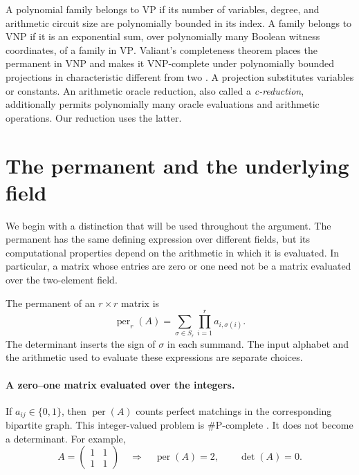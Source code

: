 \documentclass[12pt,a4paper]{article}
\theoremstyle{definition}
\theoremstyle{remark}
\newcommand{\per}{\operatorname{per}}
\newcommand{\VP}{\mathrm{VP}}
\newcommand{\VNP}{\mathrm{VNP}}
\begin{document}
A polynomial family belongs to $\VP$ if its number of variables, degree,
and arithmetic circuit size are polynomially bounded in its index. A
family belongs to $\VNP$ if it is an exponential sum, over polynomially
many Boolean witness coordinates, of a family in $\VP$. Valiant's
completeness theorem places the permanent in $\VNP$ and makes it
$\VNP$-complete under polynomially bounded projections in characteristic
different from two \cite[Theorem 2]{ValiantAlgebra}. A projection substitutes
variables or constants. An arithmetic oracle reduction, also called a
\emph{c-reduction}, additionally permits polynomially many oracle
evaluations and arithmetic operations. Our reduction uses the latter.

\section{The permanent and the underlying field}
\label{sec:binary}

We begin with a distinction that will be used throughout the argument.
The permanent has the same defining expression over different fields,
but its computational properties depend on the arithmetic in which it
is evaluated. In particular, a matrix whose entries are zero or one
need not be a matrix evaluated over the two-element field.

The permanent of an $r\times r$ matrix is
\begin{equation}
 \per_r(A)=\sum_{\sigma\in S_r}\prod_{i=1}^r a_{i,\sigma(i)}.
 \label{eq:permanent}
\end{equation}
The determinant inserts the sign of $\sigma$ in each summand. The input
alphabet and the arithmetic used to evaluate these expressions are
separate choices.

\paragraph{A zero--one matrix evaluated over the integers.}
If $a_{ij}\in\{0,1\}$, then $\per(A)$ counts perfect matchings in the
corresponding bipartite graph. This integer-valued problem is
$\#\mathrm P$-complete \cite{ValiantCounting}. It does not become a
determinant. For example,
\begin{equation}
 A=\begin{pmatrix}1&1\\1&1\end{pmatrix}
 \quad\Longrightarrow\quad \per(A)=2,\qquad\det(A)=0.
 \label{eq:binary-example}
\end{equation}
\end{document}
